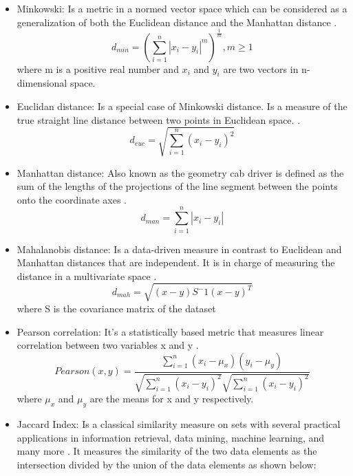 \begin{itemize}
  \item Minkowski: Is a metric in a normed vector space which can be considered as a generalization of both the Euclidean distance and the Manhattan distance \citep{b56}.
    \begin{equation}
        d_{min} = (\sum_{i=1}^{n}|x_i - y_i|^m)^\frac{1}{m}, m\geq 1
    \end{equation}
    where m is a positive real number and $x_i$ and $y_i$ are two vectors in n-dimensional space.
    \item Euclidan distance: Is a special case of Minkowski distance. Is a measure of the true straight line distance between two points in Euclidean space. \citep{b57}.
    \begin{equation}
        d_{euc} =  \sqrt{\sum_{i=1}^{n}(x_{i}-y_{i})^2}
    \end{equation}
     \item Manhattan distance: Also known as the geometry cab driver is defined as the
sum of the lengths of the projections of the line segment between the points onto the coordinate axes \citep{b58}.
     \begin{equation}
        d_{man} =  \sum_{i=1}^{n}|x_{i}-y_{i}|
    \end{equation}
    \item Mahalanobis distance: Is a data-driven measure in contrast to Euclidean and Manhattan distances that are independent. It is in charge of measuring the distance in a multivariate space \citep{b58}.
    \begin{equation}
        d_{mah}= \sqrt{(x-y)S^-1(x-y)^T}
    \end{equation}
    where S is the covariance matrix of the dataset
    \item Pearson correlation: It’s a statistically based metric that measures linear correlation between two variables x and y \citep{b61}.
    \begin{equation}
        Pearson(x,y)= \frac{\sum_{i=1}^n(x_i-\mu_x)(y_i-\mu_y)}{\sqrt{\sum_{i=1}^n(x_i-y_i)^2}\sqrt{\sum_{i=1}^n(x_i-y_i)^2}}
    \end{equation}
    where $\mu_x$ and $\mu_y$ are the means for x and y respectively.
    \item Jaccard Index: Is a classical similarity measure on sets with several practical applications in information retrieval, data mining, machine learning, and many more \citep{b35} \citep{b59}. It measures the similarity of the two data elements as the intersection divided by the union of the data elements as shown below:

\end{itemize}
